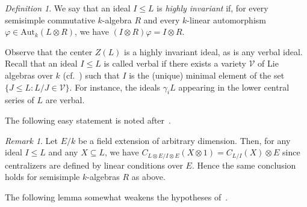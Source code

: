 \documentclass[11pt,a4paper]{amsart}
\theoremstyle{plain}
\theoremstyle{remark}
\newtheorem{rem}[thm]{Remark}
\newtheorem{dfn}[thm]{Definition}
\newcommand{\tensor}{\otimes}
\begin{document}
\begin{dfn}
We say that an ideal $I \leq L$ is {\emph{highly invariant}} if, for every semisimple commutative $k$-algebra $R$ and every $k$-linear automorphism $\varphi \in \mathrm{Aut}_k (L \tensor R)$, we have $(I \tensor R)\varphi = I \tensor R$.
\end{dfn}

Observe that the center $Z(L)$ is a highly invariant ideal, as is any verbal ideal.  Recall that an ideal $I \leq L$ is called verbal if there exists a variety $\mathcal{V}$ of Lie algebras over $k$ (cf.~\cite[\S2]{Vaughan-Lee/70}) such that $I$ is the (unique) minimal element of the set $\{ J \leq L : L / J \in \mathcal{V} \}$.  For instance, the ideals $\gamma_i L$ appearing in the lower central series of $L$ are verbal.

The following easy statement is noted after~\cite[Lemma~1]{Segal/89}.
\begin{rem} \label{rmk:segal.remark}
Let $E/k$ be a field extension of arbitrary dimension.  Then, for any ideal $I \leq L$ and any $X \subseteq L$, we have
$ C_{L \tensor E  / I \tensor E}(X \tensor 1) = C_{L/I}(X) \tensor E$ since centralizers are defined by linear conditions over $E$.  Hence the same conclusion holds for semisimple $k$-algebras $R$ as above.
\end{rem}

The following lemma somewhat weakens the hypotheses of~\cite[Lemma~1]{Segal/89}.  
\end{document}
